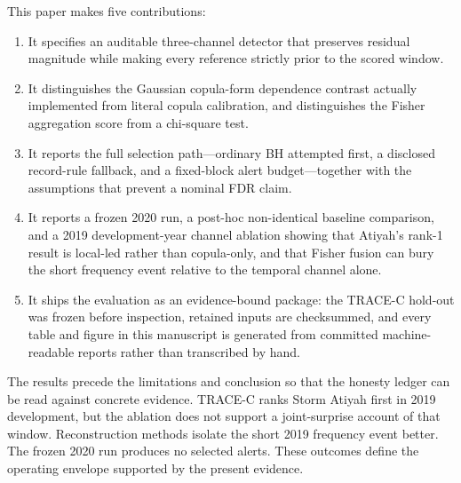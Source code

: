 This paper makes five contributions:
\begin{enumerate}
  \item It specifies an auditable three-channel detector that preserves
  residual magnitude while making every reference strictly prior to the
  scored window.
  \item It distinguishes the Gaussian copula-form dependence contrast actually
  implemented from literal copula calibration, and distinguishes the Fisher
  aggregation score from a chi-square test.
  \item It reports the full selection path---ordinary BH attempted first, a
  disclosed record-rule fallback, and a fixed-block alert budget---together
  with the assumptions that prevent a nominal FDR claim.
  \item It reports a frozen 2020 run, a post-hoc non-identical baseline
  comparison, and a 2019 development-year channel ablation showing that
  Atiyah's rank-1 result is local-led rather than copula-only, and that
  Fisher fusion can bury the short frequency event relative to the temporal
  channel alone.
  \item It ships the evaluation as an evidence-bound package: the TRACE-C
  hold-out was frozen before inspection, retained inputs are checksummed, and
  every table and figure in this manuscript is generated from committed
  machine-readable reports rather than transcribed by hand.
\end{enumerate}

The results precede the limitations and conclusion so that the honesty ledger
can be read against concrete evidence. TRACE-C ranks Storm Atiyah first in
2019 development, but the ablation does not support a joint-surprise account
of that window. Reconstruction methods isolate the short 2019 frequency event
better. The frozen 2020 run produces no selected alerts. These outcomes define
the operating envelope supported by the present evidence.
